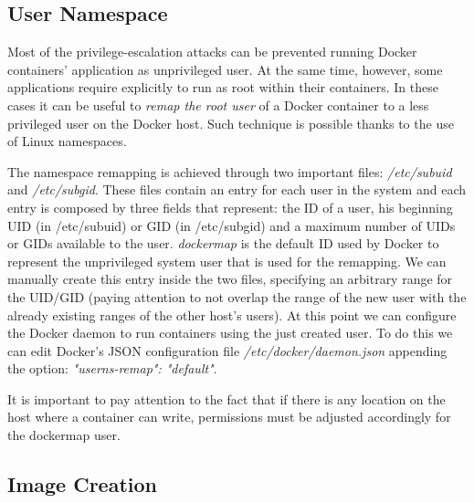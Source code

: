 \documentclass[a4paper,12pt]{article}
\begin{document}
\subsection{User Namespace}

Most of the privilege-escalation attacks can be prevented running Docker
containers' application as unprivileged user. At the same time, however, some
applications require explicitly to run as root within their containers. In these
cases it can be useful to \textit{remap the root user} \cite{isolate_namespace}
of a Docker container to a less privileged user on the Docker host. Such
technique is possible thanks to the use of Linux namespaces. \par The namespace
remapping is achieved through two important files: \textit{/etc/subuid} and
\textit{/etc/subgid}. These files contain an entry for each user in the system
and each entry is composed by three fields that represent: the ID of a user, his
beginning UID (in /etc/subuid) or GID (in /etc/subgid) and a maximum number of
UIDs or GIDs available to the user. \textit{dockermap} is the default ID used by
Docker to represent the unprivileged system user that is used for the remapping.
We can manually create this entry inside the two files, specifying an arbitrary
range for the UID/GID (paying attention to not overlap the range of the new user
with the already existing ranges of the other host's users). At this point we
can configure the Docker daemon to run containers using the just created user.
To do this we can edit Docker's JSON configuration file
\textit{/etc/docker/daemon.json} appending the option: \textit{"userns-remap":
"default"}. \par It is important to pay attention to the fact that if there is any
location on the host where a container can write, permissions must be
adjusted accordingly for the dockermap user. 

\subsection{Image Creation}
\end{document}
